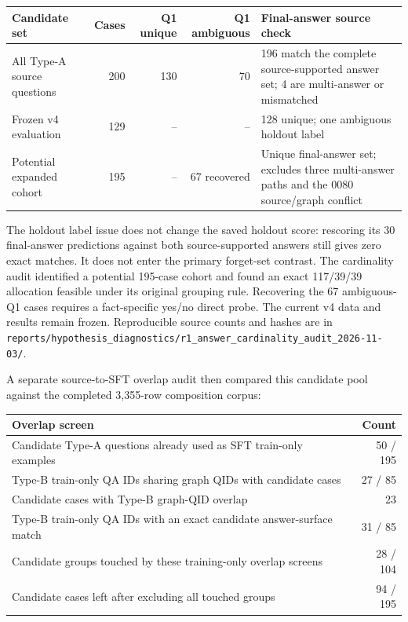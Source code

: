 \documentclass[10pt,a4paper]{article}
\begin{document}
\begin{center}
\small
\begin{tabularx}{\textwidth}{@{}l r r r X@{}}
\toprule
Candidate set & Cases & Q1 unique & Q1 ambiguous & Final-answer source check \\
\midrule
All Type-A source questions & 200 & 130 & 70 & 196 match the complete source-supported answer set; 4 are multi-answer or mismatched \\
Frozen v4 evaluation & 129 & -- & -- & 128 unique; one ambiguous holdout label \\
Potential expanded cohort & 195 & -- & 67 recovered & Unique final-answer set; excludes three multi-answer paths and the 0080 source/graph conflict \\
\bottomrule
\end{tabularx}
\end{center}

The holdout label issue does not change the saved holdout score: rescoring its 30 final-answer predictions against both source-supported answers still gives zero exact matches. It does not enter the primary forget-set contrast. The cardinality audit identified a potential 195-case cohort and found an exact 117/39/39 allocation feasible under its original grouping rule. Recovering the 67 ambiguous-Q1 cases requires a fact-specific yes/no direct probe. The current v4 data and results remain frozen. Reproducible source counts and hashes are in \texttt{reports/hypothesis\_diagnostics/r1\_answer\_cardinality\_audit\_2026-11-03/}.

A separate source-to-SFT overlap audit then compared this candidate pool against the completed 3,355-row composition corpus:

\begin{center}
\small
\begin{tabularx}{\textwidth}{@{}Xr@{}}
\toprule
Overlap screen & Count \\
\midrule
Candidate Type-A questions already used as SFT train-only examples & 50 / 195 \\
Type-B train-only QA IDs sharing graph QIDs with candidate cases & 27 / 85 \\
Candidate cases with Type-B graph-QID overlap & 23 \\
Type-B train-only QA IDs with an exact candidate answer-surface match & 31 / 85 \\
Candidate groups touched by these training-only overlap screens & 28 / 104 \\
Candidate cases left after excluding all touched groups & 94 / 195 \\
\bottomrule
\end{tabularx}
\end{center}
\end{document}
